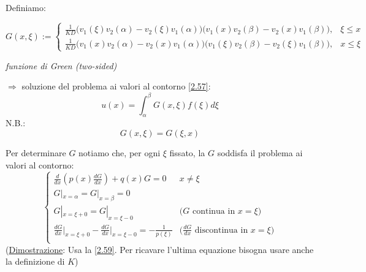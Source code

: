 \documentclass[a4paper,11pt]{report}
\begin{document}
Definiamo:
\begin{samepage}
\begin{equation}
G(x,\xi):=
\begin{cases}
\frac{1}{KD}\big(v_1(\xi)v_2(\alpha)-v_2(\xi)v_1(\alpha) \big)\big(v_1(x)v_2(\beta)-v_2(x)v_1(\beta)\big), & \xi\leq x \\
\frac{1}{KD}\big(v_1(x)v_2(\alpha)-v_2(x)v_1(\alpha) \big)\big(v_1(\xi)v_2(\beta)-v_2(\xi)v_1(\beta)\big), & x\leq \xi
\end{cases}
\label{2.59}
\end{equation}
\centerline{\emph{funzione di Green (two-sided)}}
\end{samepage}

$\Rightarrow$ soluzione del problema ai valori al contorno \eqref{2.57}:
\begin{equation}
u(x)=\int_\alpha^\beta G(x,\xi)f(\xi)d\xi
\end{equation}
N.B.: 
\begin{equation}
G(x,\xi)=G(\xi,x)
\end{equation}

Per determinare $G$ notiamo che, per ogni $\xi$ fissato, la $G$ soddisfa il problema ai valori al contorno:
\begin{equation}
\begin{cases}
\frac{d}{dx}\left(p(x)\frac{dG}{dx}\right) + q(x)G = 0 & x\neq \xi \\
G|_{x=\alpha}=G|_{x=\beta}=0 \\
G|_{x=\xi+0}=G|_{x=\xi-0} & \text{($G$ continua in $x=\xi$)} \\
\frac{dG}{dx}\big|_{x=\xi+0}-\frac{dG}{dx}\big|_{x=\xi-0}=-\frac{1}{p(\xi)} & \text{($\frac{dG}{dx}$ discontinua in $x=\xi$)} \\
\end{cases}
\label{2.62}
\end{equation}
(\underline{Dimostrazione}: Usa la \eqref{2.59}. Per ricavare l'ultima equazione bisogna usare anche la definizione di $K$)

\medskip
\end{document}
